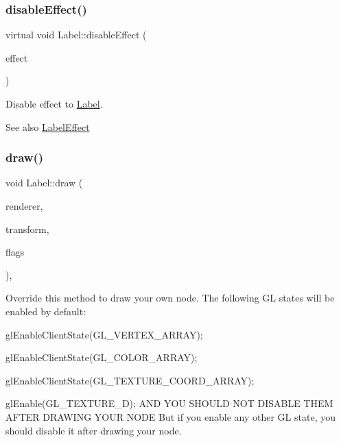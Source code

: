 \subsubsection{\texorpdfstring{disable\+Effect()}{disableEffect()}\hspace{0.1cm}{\footnotesize\ttfamily [4/4]}}
{\footnotesize\ttfamily virtual void Label\+::disable\+Effect (\begin{DoxyParamCaption}\item[{\hyperlink{group__base_ga26fd049ca5303e0cf4435208058f32e4}{Label\+Effect}}]{effect }\end{DoxyParamCaption})\hspace{0.3cm}{\ttfamily [virtual]}}

Disable effect to \hyperlink{classLabel}{Label}.

\begin{DoxySeeAlso}{See also}
{\ttfamily \hyperlink{group__base_ga26fd049ca5303e0cf4435208058f32e4}{Label\+Effect}} 
\end{DoxySeeAlso}
\mbox{\label{classLabel_ac1ceeebcd0a814f22e8b49d40671f140}} 
\subsubsection{\texorpdfstring{draw()}{draw()}\hspace{0.1cm}{\footnotesize\ttfamily [1/2]}}
{\footnotesize\ttfamily void Label\+::draw (\begin{DoxyParamCaption}\item[{\hyperlink{classRenderer}{Renderer} $\ast$}]{renderer,  }\item[{const \hyperlink{classMat4}{Mat4} \&}]{transform,  }\item[{uint32\+\_\+t}]{flags }\end{DoxyParamCaption})\hspace{0.3cm}{\ttfamily [override]}, {\ttfamily [virtual]}}

Override this method to draw your own node. The following GL states will be enabled by default\+:
\begin{DoxyItemize}
\item {\ttfamily gl\+Enable\+Client\+State(\+G\+L\+\_\+\+V\+E\+R\+T\+E\+X\+\_\+\+A\+R\+R\+A\+Y);}
\item {\ttfamily gl\+Enable\+Client\+State(\+G\+L\+\_\+\+C\+O\+L\+O\+R\+\_\+\+A\+R\+R\+A\+Y);}
\item {\ttfamily gl\+Enable\+Client\+State(\+G\+L\+\_\+\+T\+E\+X\+T\+U\+R\+E\+\_\+\+C\+O\+O\+R\+D\+\_\+\+A\+R\+R\+A\+Y);}
\item {\ttfamily gl\+Enable(\+G\+L\+\_\+\+T\+E\+X\+T\+U\+R\+E\+\_\+D);} A\+ND Y\+OU S\+H\+O\+U\+LD N\+OT D\+I\+S\+A\+B\+LE T\+H\+EM A\+F\+T\+ER D\+R\+A\+W\+I\+NG Y\+O\+UR N\+O\+DE But if you enable any other GL state, you should disable it after drawing your node.
\end{DoxyItemize}


